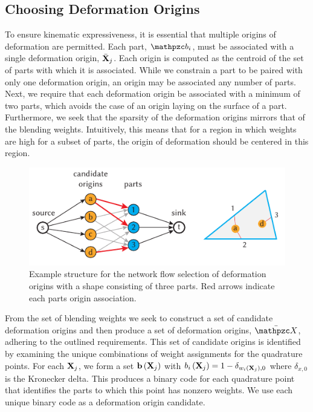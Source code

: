 \subsection{Choosing Deformation Origins}
\label{sec:origins}
To ensure kinematic expressiveness, it is essential that multiple origins of deformation are permitted. Each part, $\prt_i$, must be associated with a single deformation origin, $\bar{\mathbf{X}}_j$. Each origin is computed as the centroid of the set of parts with which it is associated. While we constrain a part to be paired with only one deformation origin, an origin may be associated any number of parts. Next, we require that each deformation origin be associated with a minimum of two parts, which avoids the case of an origin laying on the surface of a part. Furthermore, we seek that the sparsity of the deformation origins mirrors that of the blending weights. Intuitively, this means that for a region in which weights are high for a subset of parts, the origin of deformation should be centered in this region.

\begin{figure}[h]
    \includegraphics[width=\columnwidth]{figures/origin_network}
    \caption{Example structure for the network flow selection of deformation origins with a shape consisting of three parts. Red arrows indicate each parts origin association.}
    \label{fig:network_flow}
\end{figure}

From the set of blending weights we seek to construct a set of candidate deformation origins and then produce a set of deformation origins, $\XBs$, adhering to the outlined requirements. This set of candidate origins is identified by examining the unique combinations of weight assignments for the quadrature points. For each $\mathbf{X}_j$, we form a set $\mathbf{b}\left(\mathbf{X}_j\right)$ with $b_i\left(\mathbf{X}_j\right)= 1-\delta_{w_i\left(\mathbf{X}_j\right),0}$ where $\delta_{x,0}$ is the Kronecker delta. This produces a binary code for each quadrature point that identifies the parts to which this point has nonzero weights. We use each unique binary code as a deformation origin candidate.

